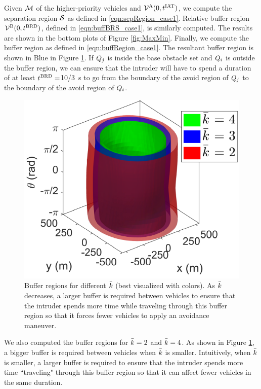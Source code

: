 Given $\mathcal{M}$ of the higher-priority vehicles and $\mathcal{V}^{\text{A}}(0, t^\text{IAT})$, we compute the separation region $\mathcal{S}$ as defined in \eqref{eqn:sepRegion_case1}. Relative buffer region $\mathcal{V}^{\text{B}}(0, t^\text{BRD})$, defined in \eqref{eqn:buffBRS_case1}, is similarly computed. The results are shown in the bottom plots of Figure \ref{fig:MaxMin}. Finally, we compute the buffer region as defined in \eqref{eqn:buffRegion_case1}. The resultant buffer region is shown in Blue in Figure \ref{fig:buffRegions}. If $Q_j$ is inside the base obstacle set and $Q_i$ is outside the buffer region, we can ensure that the intruder will have to spend a duration of at least $t^\text{BRD} = $\SI{10/3}{\s} to go from the boundary of the avoid region of $Q_j$ to the boundary of the avoid region of $Q_i$. 
\begin{figure}
  \centering
  \includegraphics[width=0.6\columnwidth]{figs/bufferRegions_3D}
  \caption{Buffer regions for different $\bar{k}$ (best visualized with colors). As $\bar{k}$ decreases, a larger buffer is required between vehicles to ensure that the intruder spends more time while traveling through this buffer region so that it forces fewer vehicles to apply an avoidance maneuver.}
  \label{fig:buffRegions}
\end{figure}
We also computed the buffer regions for $\bar{k} = 2$ and $\bar{k} = 4$. 
As shown in Figure \ref{fig:buffRegions}, a bigger buffer is required between vehicles when $\bar{k}$ is smaller. Intuitively, when $\bar{k}$ is smaller, a larger buffer is required to ensure that the intruder spends more time ``traveling" through this buffer region so that it can affect fewer vehicles in the same duration.             


